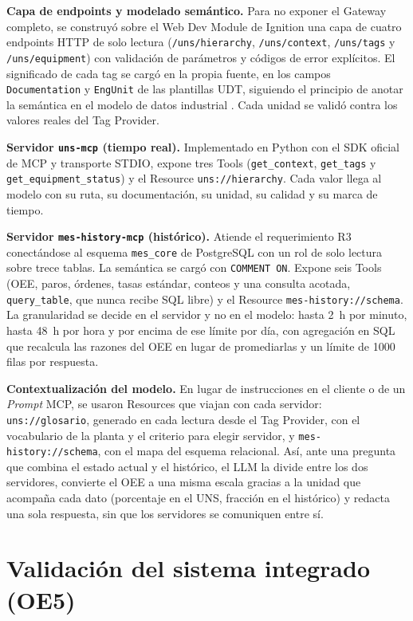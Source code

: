 \documentclass[11pt,letterpaper]{article}
\begin{document}
\textbf{Capa de endpoints y modelado semántico.} Para no exponer el Gateway completo, se construyó sobre el Web Dev Module de Ignition \cite{ignition_webdev} una capa de cuatro endpoints HTTP de solo lectura (\texttt{/uns/hierarchy}, \texttt{/uns/context}, \texttt{/uns/tags} y \texttt{/uns/equipment}) con validación de parámetros y códigos de error explícitos. El significado de cada tag se cargó en la propia fuente, en los campos \texttt{Documentation} y \texttt{EngUnit} de las plantillas UDT, siguiendo el principio de anotar la semántica en el modelo de datos industrial \cite{KattiOPCUASemantics2018}. Cada unidad se validó contra los valores reales del Tag Provider.

\textbf{Servidor \texttt{uns-mcp} (tiempo real).} Implementado en Python con el SDK oficial de MCP y transporte STDIO, expone tres Tools (\texttt{get\_context}, \texttt{get\_tags} y \texttt{get\_equipment\_status}) y el Resource \texttt{uns://hierarchy}. Cada valor llega al modelo con su ruta, su documentación, su unidad, su calidad y su marca de tiempo.

\textbf{Servidor \texttt{mes-history-mcp} (histórico).} Atiende el requerimiento R3 conectándose al esquema \texttt{mes\_core} de PostgreSQL con un rol de solo lectura sobre trece tablas. La semántica se cargó con \texttt{COMMENT ON}. Expone seis Tools (OEE, paros, órdenes, tasas estándar, conteos y una consulta acotada, \texttt{query\_table}, que nunca recibe SQL libre) y el Resource \texttt{mes-history://schema}. La granularidad se decide en el servidor y no en el modelo: hasta 2~h por minuto, hasta 48~h por hora y por encima de ese límite por día, con agregación en SQL que recalcula las razones del OEE en lugar de promediarlas y un límite de 1000 filas por respuesta.

\textbf{Contextualización del modelo.} En lugar de instrucciones en el cliente o de un \textit{Prompt} MCP, se usaron Resources que viajan con cada servidor: \texttt{uns://glosario}, generado en cada lectura desde el Tag Provider, con el vocabulario de la planta y el criterio para elegir servidor, y \texttt{mes-history://schema}, con el mapa del esquema relacional. Así, ante una pregunta que combina el estado actual y el histórico, el LLM la divide entre los dos servidores, convierte el OEE a una misma escala gracias a la unidad que acompaña cada dato (porcentaje en el UNS, fracción en el histórico) y redacta una sola respuesta, sin que los servidores se comuniquen entre sí.

\section{Validación del sistema integrado (OE5)}
\end{document}
